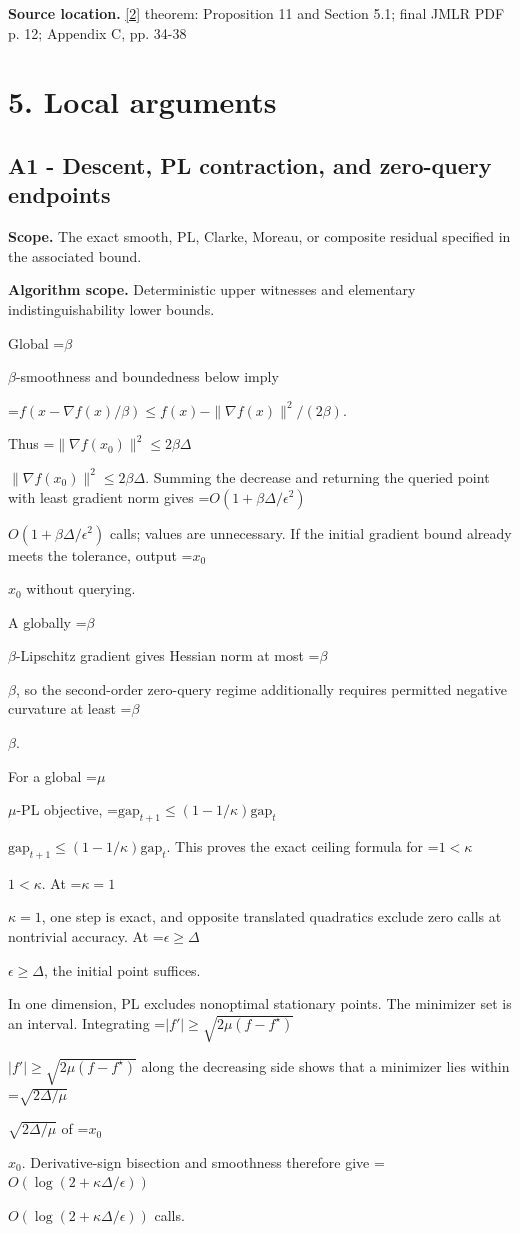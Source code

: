 \documentclass[10pt,a4paper]{article}
\newcommand{\AtlasMath}[1]{\par\begingroup\centering\setbox0=\hbox{$\displaystyle #1$}\ifdim\wd0>1.4\linewidth\typeout{ATLAS WIDE FORMULA: \the\wd0}\fi\ifdim\wd0>\linewidth\resizebox{\linewidth}{!}{\box0}\else\box0\fi\par\endgroup}
\newcommand{\AtlasInlineMath}[1]{\begingroup\setbox0=\hbox{$#1$}\ifdim\wd0>.4\linewidth\endgroup\AtlasMath{#1}\else\endgroup$#1$\fi}
\begin{document}
\textbf{Source location.} \href{https://www.jmlr.org/papers/volume23/21-1507/21-1507.pdf}{[2]} theorem: Proposition 11 and Section 5.1; final JMLR PDF p. 12; Appendix C, pp. 34-38

\section{5. Local arguments}
\subsection{A1 - Descent, PL contraction, and zero-query endpoints}
\textbf{Scope.} The exact smooth, PL, Clarke, Moreau, or composite residual specified in the associated bound.

\textbf{Algorithm scope.} Deterministic upper witnesses and elementary indistinguishability lower bounds.

Global \AtlasInlineMath{\beta}-smoothness and boundedness below imply

\AtlasMath{f(x-\nabla f(x)/\beta)\le f(x)-\|\nabla f(x)\|^2/(2\beta).}

Thus \AtlasInlineMath{\|\nabla f(x_0)\|^2\le2\beta\Delta}. Summing the decrease and returning the queried point with least gradient norm gives \AtlasInlineMath{O(1+\beta\Delta/\epsilon^2)} calls; values are unnecessary. If the initial gradient bound already meets the tolerance, output \AtlasInlineMath{x_0} without querying.

A globally \AtlasInlineMath{\beta}-Lipschitz gradient gives Hessian norm at most \AtlasInlineMath{\beta}, so the second-order zero-query regime additionally requires permitted negative curvature at least \AtlasInlineMath{\beta}.

For a global \AtlasInlineMath{\mu}-PL objective,
\AtlasInlineMath{\mathrm{gap}_{t+1}\le(1-1/\kappa)\mathrm{gap}_t}.
This proves the exact ceiling formula for \AtlasInlineMath{1<\kappa}. At \AtlasInlineMath{\kappa=1}, one step is exact, and opposite translated quadratics exclude zero calls at nontrivial accuracy. At \AtlasInlineMath{\epsilon\ge\Delta}, the initial point suffices.

In one dimension, PL excludes nonoptimal stationary points. The minimizer set is an interval. Integrating
\AtlasInlineMath{|f'|\ge\sqrt{2\mu(f-f^\star)}}
along the decreasing side shows that a minimizer lies within \AtlasInlineMath{\sqrt{2\Delta/\mu}} of \AtlasInlineMath{x_0}. Derivative-sign bisection and smoothness therefore give \AtlasInlineMath{O(\log(2+\kappa\Delta/\epsilon))} calls.
\end{document}
